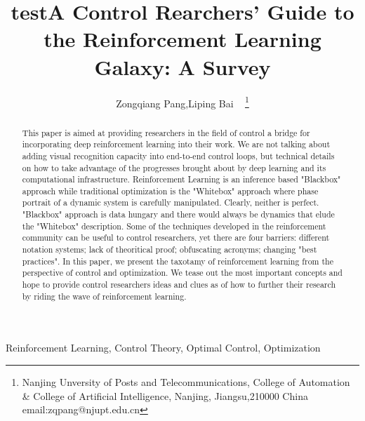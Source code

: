 \documentclass[journal]{IEEEtran}
\begin{document}
    \title{test}
\title{A Control Rearchers' Guide to the Reinforcement Learning Galaxy: A Survey}
\author{ Zongqiang Pang,Liping Bai ~ \thanks{Nanjing Unversity of Posts and Telecommunications, College of Automation \& College of Artificial Intelligence, Nanjing, Jiangsu,210000 China email:zqpang@njupt.edu.cn}}
\maketitle
\begin{abstract}
This paper is aimed at providing researchers in the field of control a bridge for incorporating deep reinforcement learning into their work. We are not talking about adding visual recognition capacity into end-to-end control loops, but technical details on how to take advantage of the progresses brought about by deep learning and its computational infrastructure. Reinforcement Learning is an inference based "Blackbox" approach while traditional optimization is the "Whitebox" approach where phase portrait of a dynamic system is carefully manipulated. Clearly, neither is perfect. "Blackbox" approach is data hungary and there would always be dynamics that elude the "Whitebox" description. Some of the techniques developed in the reinforcement community can be useful to control researchers, yet there are four barriers: different notation systems; lack of theoritical proof; obfuscating acronyms; changing "best practices". In this paper, we present the taxotamy of reinforcement learning from the perspective of control and optimization. We tease out the most important concepts and hope to provide control researchers ideas and clues as of how to further their research by riding the wave of reinforcement learning.
\end{abstract}
\begin{IEEEkeywords}
Reinforcement Learning, Control Theory, Optimal Control, Optimization
\end{IEEEkeywords}
%
\IEEEpeerreviewmaketitle
\end{document}

